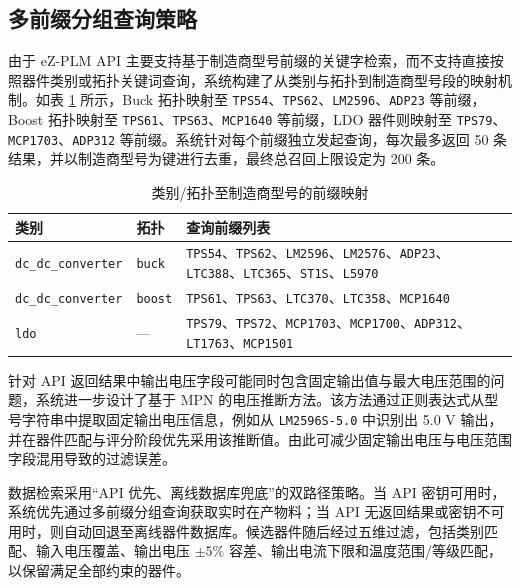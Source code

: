 \subsection{多前缀分组查询策略}

由于 eZ-PLM API 主要支持基于制造商型号前缀的关键字检索，而不支持直接按照器件类别或拓扑关键词查询，系统构建了从类别与拓扑到制造商型号段的映射机制。如表 \ref{tab:keywords} 所示，Buck 拓扑映射至 \texttt{TPS54}、\texttt{TPS62}、\texttt{LM2596}、\texttt{ADP23} 等前缀，Boost 拓扑映射至 \texttt{TPS61}、\texttt{TPS63}、\texttt{MCP1640} 等前缀，LDO 器件则映射至 \texttt{TPS79}、\texttt{MCP1703}、\texttt{ADP312} 等前缀。系统针对每个前缀独立发起查询，每次最多返回 50 条结果，并以制造商型号为键进行去重，最终总召回上限设定为 200 条。

\begin{table}[H]
\centering
\caption{类别/拓扑至制造商型号的前缀映射}
\label{tab:keywords}
\footnotesize
\setlength{\tabcolsep}{4pt}
\renewcommand{\arraystretch}{0.9}
\begin{tabularx}{\textwidth}{p{2.8cm}p{1cm}X}
\toprule
\textbf{类别} & \textbf{拓扑} & \textbf{查询前缀列表} \\
\midrule
\texttt{dc\_dc\_converter} & \texttt{buck} & \texttt{TPS54}、\texttt{TPS62}、\texttt{LM2596}、\texttt{LM2576}、\texttt{ADP23}、\texttt{LTC388}、\texttt{LTC365}、\texttt{ST1S}、\texttt{L5970} \\
\texttt{dc\_dc\_converter} & \texttt{boost} & \texttt{TPS61}、\texttt{TPS63}、\texttt{LTC370}、\texttt{LTC358}、\texttt{MCP1640} \\
\texttt{ldo} & --- & \texttt{TPS79}、\texttt{TPS72}、\texttt{MCP1703}、\texttt{MCP1700}、\texttt{ADP312}、\texttt{LT1763}、\texttt{MCP1501} \\
\bottomrule
\end{tabularx}
\end{table}

针对 API 返回结果中输出电压字段可能同时包含固定输出值与最大电压范围的问题，系统进一步设计了基于 MPN 的电压推断方法。该方法通过正则表达式从型号字符串中提取固定输出电压信息，例如从 \texttt{LM2596S-5.0} 中识别出 5.0 V 输出，并在器件匹配与评分阶段优先采用该推断值。由此可减少固定输出电压与电压范围字段混用导致的过滤误差。

数据检索采用“API 优先、离线数据库兜底”的双路径策略。当 API 密钥可用时，系统优先通过多前缀分组查询获取实时在产物料；当 API 无返回结果或密钥不可用时，则自动回退至离线器件数据库。候选器件随后经过五维过滤，包括类别匹配、输入电压覆盖、输出电压 $\pm 5\%$ 容差、输出电流下限和温度范围/等级匹配，以保留满足全部约束的器件。


